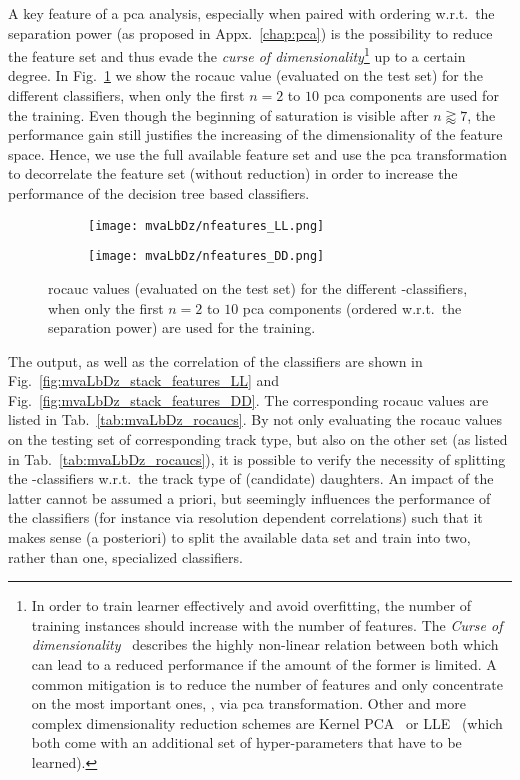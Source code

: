 A key feature of a \gls{pca} analysis, especially when paired with ordering w.r.t.\ the separation power (as proposed in Appx.~\ref{chap:pca}) is the possibility to reduce the feature set and thus evade the \textit{curse of dimensionality}\footnote{In order to train learner effectively and avoid overfitting, the number of training instances should increase with the number of features. The \textit{Curse of dimensionality}~\cite{curseofdim} describes the highly non-linear relation between both which can lead to a reduced performance if the amount of the former is limited. A common mitigation is to reduce the number of features and only concentrate on the most important ones, \eg{}, via \gls{pca} transformation. Other and more complex dimensionality reduction schemes are Kernel PCA~\cite{kernelpca} or LLE~\cite{lle} (which both come with an additional set of hyper-parameters that have to be learned).} up to a certain degree.
In Fig.~\ref{fig:mvaLbDz_nfeatures} we show the \gls{rocauc} value (evaluated on the test set) for the different classifiers, when only the first $n=2$ to $10$ \gls{pca} components are used for the training.
Even though the beginning of saturation is visible after $n \gtrapprox 7$, the performance gain still justifies the increasing of the dimensionality of the feature space.
Hence, we use the full available feature set and use the \gls{pca} transformation to decorrelate the feature set (without reduction) in order to increase the performance of the decision tree based classifiers.

\begin{figure}[htbp]
    \centering
    \begin{subfigure}[b]{.49\textwidth}
        \centering
        \texttt{[image: mvaLbDz/nfeatures\_LL.png]}
    \end{subfigure}
    \begin{subfigure}[b]{.49\textwidth}
        \centering
        \texttt{[image: mvaLbDz/nfeatures\_DD.png]}
    \end{subfigure}
    \caption{\gls{rocauc} values (evaluated on the test set) for the different \Lb-\Dz classifiers, when only the first $n=2$ to $10$ \gls{pca} components (ordered w.r.t.\ the separation power) are used for the training.}
    \label{fig:mvaLbDz_nfeatures}
\end{figure}

The output, as well as the correlation of the classifiers are shown in Fig.~\ref{fig:mvaLbDz_stack_features_LL} and Fig.~\ref{fig:mvaLbDz_stack_features_DD}.
The corresponding \gls{rocauc} values are listed in Tab.~\ref{tab:mvaLbDz_rocaucs}.
By not only evaluating the \gls{rocauc} values on the testing set of corresponding track type, but also on the other set (as listed in Tab.~\ref{tab:mvaLbDz_rocaucs}), it is possible to verify the necessity of splitting the \Lb-\Dz classifiers w.r.t.\ the track type of \Lz (candidate) daughters.
An impact of the latter cannot be assumed a priori, but seemingly influences the performance of the classifiers (for instance via resolution dependent correlations) such that it makes sense (a posteriori) to split the available data set and train into two, rather than one, specialized classifiers.

